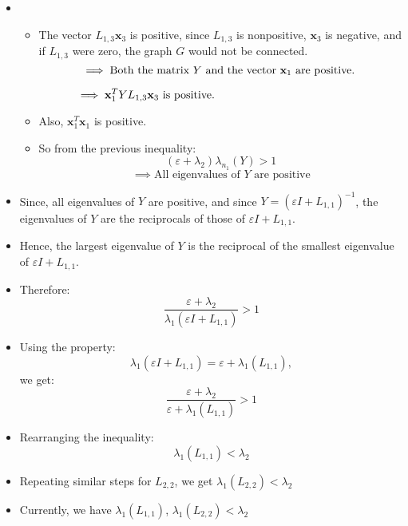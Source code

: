 \documentclass[aspectratio=169]{beamer}
\begin{document}
\begin{frame}

\begin{itemize}
\item \begin{itemize}
   

    \item The vector \( L_{1,3}\mathbf{x}_3 \) is positive, since
     \( L_{1,3} \) is nonpositive, \( \mathbf{x}_3 \) is negative,
        and if \( L_{1,3} \) were zero, the graph \( G \) would not be connected.
    \[ \implies \text{Both the matrix \( Y \) and the vector \( \mathbf{x}_1 \) are positive. }\]
    
   \[ \implies \mathbf{x}_1^T Y L_{1,3} \mathbf{x}_3 \text{ is positive.} \hspace{4.7cm} \]
    
    \item Also, \( \mathbf{x}_1^T \mathbf{x}_1 \) is positive.

    \item So from the previous inequality:
    \[
    (\varepsilon + \lambda_2)\lambda_{n_1}(Y) > 1
    \]
    \[
    \implies \text{All eigenvalues of \(Y\) are positive}
    \]
\end{itemize}
    \item Since, all eigenvalues of \( Y \) are positive, and since \( Y = (\varepsilon I + L_{1,1})^{-1} \), the eigenvalues of \( Y \) are the reciprocals of those of \( \varepsilon I + L_{1,1} \).
    
    \item Hence, the largest eigenvalue of \( Y \) is the reciprocal of the smallest eigenvalue of \( \varepsilon I + L_{1,1} \).
\end{itemize}
\end{frame}

\begin{frame}
\begin{itemize}
    \item Therefore:
    \[
    \frac{\varepsilon + \lambda_2}{\lambda_1(\varepsilon I + L_{1,1})} > 1
    \]

    \item Using the property:
    \[
    \lambda_1(\varepsilon I + L_{1,1}) = \varepsilon + \lambda_1(L_{1,1}),
    \]
    we get:
    \[
    \frac{\varepsilon + \lambda_2}{\varepsilon + \lambda_1(L_{1,1})} > 1
    \]

    \item Rearranging the inequality:
    \[
    \lambda_1(L_{1,1}) < \lambda_2
    \]

    \item Repeating similar steps for \( L_{2,2}\), we get \(\lambda_1(L_{2,2}) < \lambda_2\)
    \item Currently, we have  \( \lambda_1(L_{1,1}) \),  \( \lambda_1(L_{2,2}) < \lambda_2 \)
\end{itemize}
\end{frame}
\end{document}
